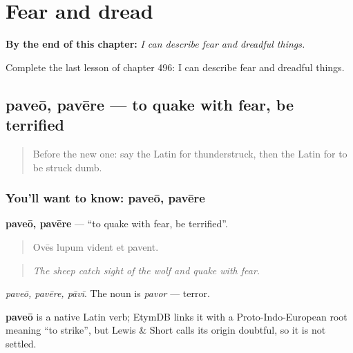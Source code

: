 
\chapter{Fear and dread}
\label{ch:la-fear-and-dread}

\begin{chapteropening}
\textbf{By the end of this chapter:} \emph{I can describe fear and dreadful things.}

Complete the last lesson of chapter 496: I can describe fear and dreadful things.
\end{chapteropening}

\section[paveō, pavēre]{paveō, pavēre — to quake with fear, be terrified}

\label{lesson:LA-C496-paveo}



\begin{quote}
Before the new one: say the Latin for thunderstruck, then the Latin for to be struck dumb.
\end{quote}

\subsection*{You'll want to know: paveō, pavēre}
\textbf{paveō, pavēre} — \textquotedblleft{}to quake with fear, be terrified\textquotedblright{}.

\begin{quote}
Ovēs lupum vident et pavent.
\end{quote}

\begin{quote}
\emph{The sheep catch sight of the wolf and quake with fear.}
\end{quote}

\emph{paveō, pavēre, pāvī}. The noun is \emph{pavor} — terror.

\begin{cousinweb}
\textbf{paveō} is a native Latin verb; EtymDB links it with a Proto-Indo-European root meaning \textquotedblleft{}to strike\textquotedblright{}, but Lewis \& Short calls its origin doubtful, so it is not settled.
\end{cousinweb}

